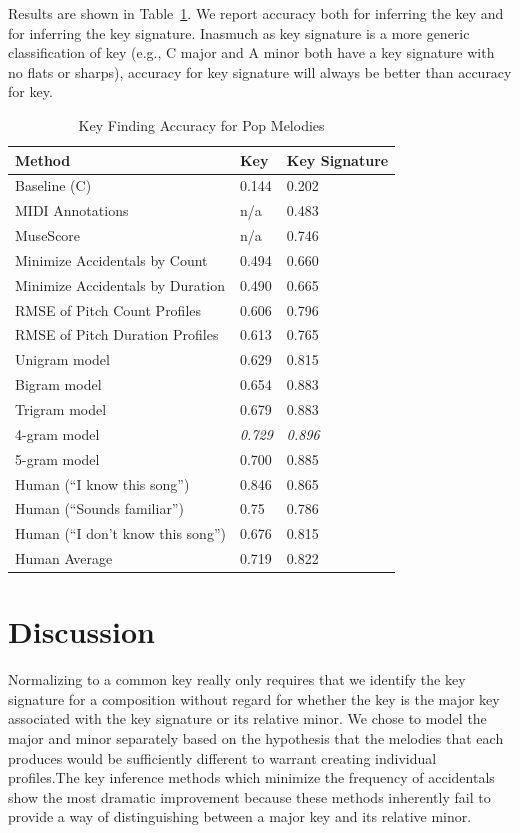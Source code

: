 \documentclass[letterpaper]{article}
\begin{document}
Results are shown in Table~\ref{tab:results}. We report accuracy both for inferring the key and for inferring the key signature. Inasmuch as key signature is a more generic classification of key (e.g., C major and A minor both have a key signature with no flats or sharps), accuracy for key signature will always be better than accuracy for key.
\begin{table}[]
\centering
\caption{Key Finding Accuracy for Pop Melodies}
\label{tab:results}
\begin{tabular}{@{}lll@{}}
\toprule
Method & Key & Key Signature \\ \midrule
Baseline (C)	&	0.144 	&	0.202 \\
MIDI	Annotations		&	n/a		&	0.483 \\
MuseScore	&	n/a		&	0.746 \\ \midrule
Minimize Accidentals	 by Count	&	0.494 &		0.660 \\
Minimize Accidentals	 by Duration	&	0.490 &		0.665 \\
RMSE of Pitch Count Profiles	&	0.606	&	0.796	\\
RMSE of Pitch Duration Profiles	&	0.613	&	0.765	\\ \midrule
Unigram model    	&	0.629	& 0.815       \\
Bigram model		&	0.654	&	0.883	\\
Trigram model		&	0.679	&	0.883	\\
4-gram model		&	\emph{0.729} &	\emph{0.896}	\\
5-gram model		&	0.700 &	0.885              \\ \bottomrule
Human (``I know this song'')		&	0.846	&	0.865	\\
Human (``Sounds familiar'') 		&	0.75 &	0.786	\\
Human (``I don't know this song'')		&	0.676 &	0.815              \\ \midrule
Human Average		&	0.719 &	0.822              \\\bottomrule
\end{tabular}
\end{table}

\section{Discussion}

Normalizing to a common key really only requires that we identify the key signature for a composition without regard for whether the key is the major key associated with the key signature or its relative minor. We chose to model the major and minor separately based on the hypothesis that the melodies that each produces would be sufficiently different to warrant creating individual profiles.The key inference methods which minimize the frequency of accidentals show the most dramatic improvement because these methods inherently fail to provide a way of distinguishing between a major key and its relative minor.
\end{document}
